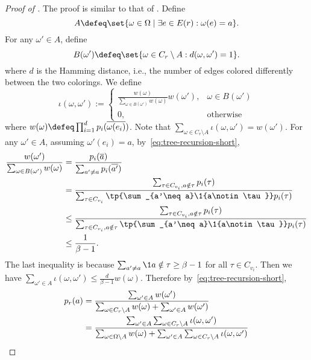     \begin{proof}[Proof of ] The proof is similar to that of .
    Define
\[A \defeq \set{\omega\in \Omega \mid \exists e\in E(r): \omega(e) = a}.\]
For any $\omega' \in A$, define
\[
    B(\omega')\defeq \set{\omega\in C_r\setminus A : d(\omega, \omega') = 1}.
\]
where $d$ is the Hamming distance, i.e., the number of edges colored differently between the two colorings.
        We define
        $$
            \iota(\omega,\omega') := \begin{cases}
                \frac{w(\omega)}{\sum_{\omega\in B(\omega')}w(\omega)}w(\omega'),&\omega\in B(\omega')
                \\ 0,& \text{otherwise}
            \end{cases}
        $$
        where $w(\omega) \defeq \prod_{i=1}^{d} \*p_i(\overline{\omega(e_i)})$. Note that $\sum_{\omega \in C_r\setminus A} \iota(\omega,\omega')=w(\omega')$.
        For any $\omega' \in A$, assuming $\omega'(e_i) = a$, by~\eqref{eq:tree-recursion-short},
        \begin{align*}
            \frac{w(\omega')}{\sum_{\omega\in B(\omega')} w(\omega)}
              &= \frac{\*p_i(\overline a)}{\sum_{a'\neq a} \*p_i(\overline{a'})}
            \\&= \frac{\sum_{\tau\in C_{v_i},a\notin \tau}\*p_i(\tau)}
              {\sum_{\tau\in C_{v_i}} \tp{\sum_{a'\neq a}\1{a\notin \tau}} \*p_i(\tau)}
            \\&\leq \frac{\sum_{\tau\in C_{v_i},a\notin \tau}\*p_i(\tau)}
              {\sum_{\tau\in C_{v_i}, a\notin\tau} \tp{\sum_{a'\neq a}\1{a\notin \tau}} \*p_i(\tau)}
            \\&\le \frac{1}{\beta-1}.
        \end{align*}
    The last inequality is because $\sum_{a'\neq a}\1{a\notin \tau}\ge \beta-1$ for all $\tau\in C_{v_i}$.
    Then we have $\sum_{\omega' \in A} \iota(\omega, \omega')\leq \frac{d}{\beta-1} w(\omega)$.    
    Therefore by~\eqref{eq:tree-recursion-short},
    \begin{align*}
\*p_r(a)
&= \frac{\sum_{\omega'\in A} w(\omega')}{\sum_{\omega\in C_r\setminus A} w(\omega) + \sum_{\omega'\in A} w(\omega')}\\
&= \frac{\sum_{\omega'\in A}\sum_{\omega\in C_r\setminus A} \iota(\omega, \omega')}
        {\sum_{\omega\in \Omega\setminus A} w(\omega) + \sum_{\omega'\in A}\sum_{\omega\in C_r\setminus A} \iota(\omega, \omega')}\\

\end{align*}
\end{proof}
